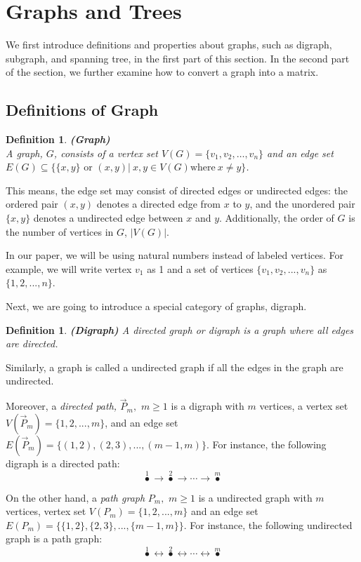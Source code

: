 \documentclass[twoside,11pt]{article}
\newtheorem{definition}[theorem]{Definition}
\numberwithin{equation}{section} \DeclareMathOperator{\Var}{Var}
\newcommand{\bdf}{\begin{definition}}
\newcommand{\edf}{\end{definition}}
\newcommand{\ora}[1]{\overrightarrow{#1}}
\newcommand{\ra}{\rightarrow}
\begin{document}
\section{Graphs and Trees}
We first introduce definitions and properties about graphs, such as digraph, subgraph, and spanning tree, in the first part of this section. In the second part of the section, we further examine how to convert a graph into a matrix.

\subsection{Definitions of Graph}

\bdf
{\bf (Graph)}\\
A {\it graph}, $G$, consists of a vertex set $V(G)=\{v_1, v_2, \dots, v_n\}$ and an edge set $E(G)\subseteq \{\{x, y\}\textrm{ or } (x,y) |\ x, y \in V(G) \text{where}\ x \neq y \}$. 
\edf

This means, the edge set may consist of directed edges or undirected edges: the ordered pair $(x,y)$ denotes a directed edge from $x$ to $y$, and the unordered pair $\{x,y\}$ denotes a undirected edge between $x$ and $y$.
Additionally, the order of $G$ is the number of vertices in $G$, $|V(G)|$.

In our paper, we will be using natural numbers instead of labeled vertices. For example, we will write vertex $v_1$ as 1 and a set of vertices $\{v_1,v_2,...,v_n\}$ as $\{1,2,...,n\}$. 

Next, we are going to introduce a special category of graphs, digraph.

\bdf
{\bf (Digraph)}
A {\it directed graph} or {\it digraph} is a graph where all edges are directed.
\edf
Similarly, a graph is called a undirected graph if all the edges in the graph are undirected.

Moreover, a {\it directed path,} $\ora{P}_m,$ $m\geq 1$ is a digraph with $m$ vertices, a vertex set
 $V(\ora{P}_m)=\{1,2,...,m\}$, and an edge set
 $E(\ora{P}_m)=\{(1,2),(2,3),...,(m-1,m)\}.$ For instance, the following digraph is a directed path:
$$\overset{1}{\bullet}\ra \overset{2}{\bullet} \ra \cdots \ra \overset{m}{\bullet}$$

On the other hand, a {\it path graph } ${P_m},$ $m\geq 1$ is a undirected graph with $m$ vertices, vertex set $V({P_m})=\{1,2,...,m\}$ and an edge set $E({P_m})=\{\{1,2\},\{2,3\},...,\{m-1,m\}\}$. For instance, the following undirected graph is a path graph:
$$\overset{1}{\bullet}\leftrightarrow \overset{2}{\bullet} \leftrightarrow \cdots \leftrightarrow \overset{m}{\bullet}$$
\end{document}
